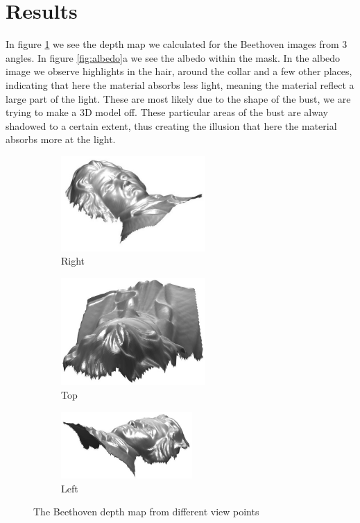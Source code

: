 \documentclass[12pt,a4paper,oneside,final]{article}
\begin{document}
\section{Results}
In figure \ref{fig:BeethovenDepth} we see the depth map we calculated for the Beethoven images from 3 angles. In figure \ref{fig:albedo}a we see the albedo within the mask. In the albedo image we observe highlights in the hair, around the collar and a few other places, indicating that here the material absorbs less light, meaning the material reflect a large part of the light. These are most likely due to the shape of the bust, we are trying to make a 3D model off. These particular areas of the bust are alway shadowed to a certain extent, thus creating the illusion that here the material absorbs more at the light. 
\begin{figure}[H]
	\centering
	\begin{subfigure}{.33\textwidth}
		\centering
		\includegraphics[width=5.5cm]{Beethoven1}
		\caption{Right}
	\end{subfigure}%
	\begin{subfigure}{.33\textwidth}
		\centering
		\includegraphics[width=5.5cm]{Beethoven2}
		\caption{Top}
	\end{subfigure}%
	\begin{subfigure}{.33\textwidth}
		\centering
		\includegraphics[width=5cm]{Beethoven3}
		\caption{Left}
	\end{subfigure}
	\caption{The Beethoven depth map from different view points}
	\label{fig:BeethovenDepth}
\end{figure}
\end{document}
